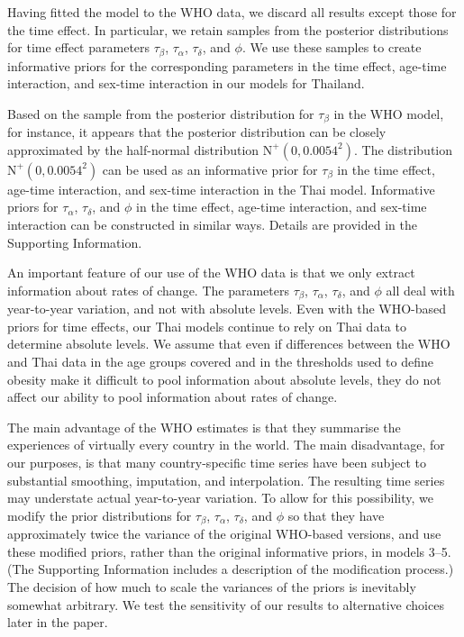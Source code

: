 \documentclass[10pt,letterpaper]{article}
\begin{document}
Having fitted the model to the WHO data, we discard all results except
those for the time effect. In particular, we retain samples from the
posterior distributions for time effect parameters \(\tau_{\beta}\),
\(\tau_{\alpha}\), \(\tau_{\delta}\), and \(\phi\). We use these samples
to create informative priors for the corresponding parameters in the
time effect, age-time interaction, and sex-time interaction in our
models for Thailand.

Based on the sample from the posterior distribution for \(\tau_{\beta}\)
in the WHO model, for instance, it appears that the posterior
distribution can be closely approximated by the half-normal distribution
\(\text{N}^+(0, 0.0054^2)\). The distribution
\(\text{N}^+(0, 0.0054^2)\) can be used as an informative prior for
\(\tau_{\beta}\) in the time effect, age-time interaction, and sex-time
interaction in the Thai model. Informative priors for \(\tau_{\alpha}\),
\(\tau_{\delta}\), and \(\phi\) in the time effect, age-time
interaction, and sex-time interaction can be constructed in similar
ways. Details are provided in the Supporting Information.

An important feature of our use of the WHO data is that we only extract
information about rates of change. The parameters \(\tau_{\beta}\),
\(\tau_{\alpha}\), \(\tau_{\delta}\), and \(\phi\) all deal with
year-to-year variation, and not with absolute levels. Even with the
WHO-based priors for time effects, our Thai models continue to rely on
Thai data to determine absolute levels. We assume that even if
differences between the WHO and Thai data in the age groups covered and
in the thresholds used to define obesity make it difficult to pool
information about absolute levels, they do not affect our ability to
pool information about rates of change.

The main advantage of the WHO estimates is that they summarise the
experiences of virtually every country in the world. The main
disadvantage, for our purposes, is that many country-specific time
series have been subject to substantial smoothing, imputation, and
interpolation. The resulting time series may understate actual
year-to-year variation. To allow for this possibility, we modify the
prior distributions for \(\tau_{\beta}\), \(\tau_{\alpha}\),
\(\tau_{\delta}\), and \(\phi\) so that they have approximately twice
the variance of the original WHO-based versions, and use these modified
priors, rather than the original informative priors, in models 3--5.
(The Supporting Information includes a description of the modification
process.) The decision of how much to scale the variances of the priors
is inevitably somewhat arbitrary. We test the sensitivity of our results
to alternative choices later in the paper.
\end{document}
